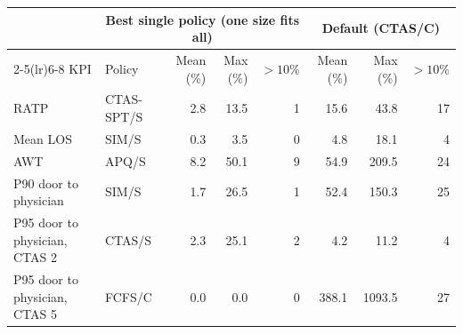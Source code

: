 \begin{tabular}{llrrrrrr}
\toprule
 & \multicolumn{4}{c}{Best single policy (one size fits all)} & \multicolumn{3}{c}{Default (CTAS/C)} \\
\cmidrule(lr){2-5}\cmidrule(lr){6-8}
KPI & Policy & Mean (\%) & Max (\%) & $>10\%$ & Mean (\%) & Max (\%) & $>10\%$ \\
\midrule
RATP & CTAS-SPT/S & 2.8 & 13.5 & 1 & 15.6 & 43.8 & 17 \\
Mean LOS & SIM/S & 0.3 & 3.5 & 0 & 4.8 & 18.1 & 4 \\
AWT & APQ/S & 8.2 & 50.1 & 9 & 54.9 & 209.5 & 24 \\
P90 door to physician & SIM/S & 1.7 & 26.5 & 1 & 52.4 & 150.3 & 25 \\
P95 door to physician, CTAS 2 & CTAS/S & 2.3 & 25.1 & 2 & 4.2 & 11.2 & 4 \\
P95 door to physician, CTAS 5 & FCFS/C & 0.0 & 0.0 & 0 & 388.1 & 1093.5 & 27 \\
\bottomrule
\end{tabular}
